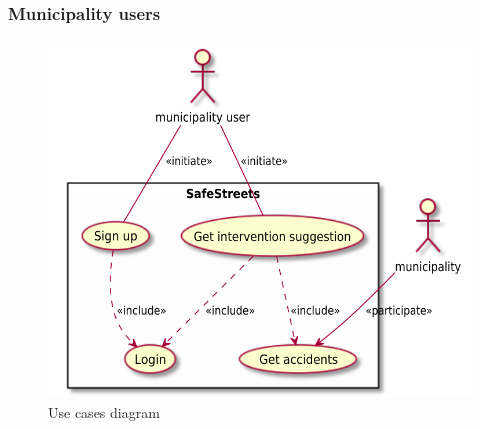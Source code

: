 \documentclass[a4paper]{article}
\begin{document}
\subsubsection{Municipality users}

\begin{figure}[H]
\centering
\includegraphics[width=\textwidth]{municipality_usecases}
\caption{Use cases diagram}
\end{figure}
\end{document}
